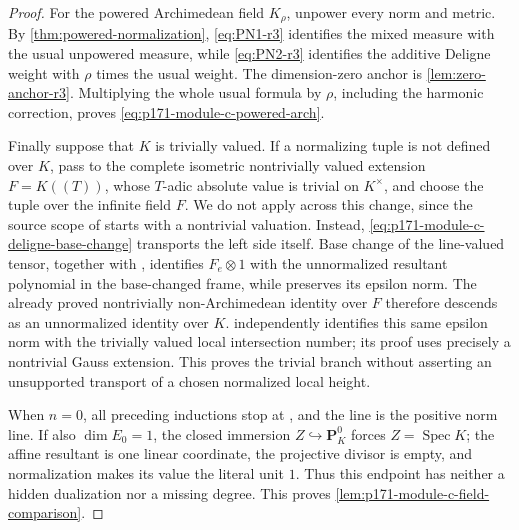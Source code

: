 \begin{proof}
For the powered Archimedean field \(K_\rho\), unpower every norm and metric.
By \cref{thm:powered-normalization}, \eqref{eq:PN1-r3} identifies the mixed
measure with the usual unpowered measure, while \eqref{eq:PN2-r3}
identifies the additive Deligne weight with \(\rho\) times the usual
weight.  The dimension-zero anchor is \cref{lem:zero-anchor-r3}.
Multiplying the whole usual formula by \(\rho\), including the harmonic
correction, proves \eqref{eq:p171-module-c-powered-arch}.

Finally suppose that \(K\) is trivially valued.  If a normalizing tuple is
not defined over \(K\), pass to the complete isometric nontrivially valued
extension \(F=K((T))\), whose \(T\)-adic absolute value is trivial on
\(K^\times\), and choose the tuple over the infinite field \(F\).  We do
not apply \cite[Proposition~3.8.9]{ChenMoriwaki21AdelicIntersection} across
this change, since the source scope of
\cite[Section~3.8]{ChenMoriwaki21AdelicIntersection} starts with a
nontrivial valuation.  Instead,
\eqref{eq:p171-module-c-deligne-base-change} transports the left side
itself.  Base change of the line-valued tensor, together with
\cite[Remark~1.6.8]{ChenMoriwaki21AdelicIntersection}, identifies
\(F_e\otimes 1\) with the unnormalized resultant polynomial in the
base-changed frame, while
\cite[Remark~3.8.3]{ChenMoriwaki21AdelicIntersection} preserves its epsilon
norm.  The already proved
nontrivially non-Archimedean identity over \(F\) therefore descends as an
unnormalized identity over \(K\).
\cite[Proposition~3.9.3, formula~(3.27)]{ChenMoriwaki21AdelicIntersection}
independently identifies this same epsilon norm with the trivially valued
local intersection number; its proof uses precisely a nontrivial Gauss
extension.  This proves the trivial branch without asserting an unsupported
transport of a chosen normalized local height.

When \(n=0\), all preceding inductions stop at
\cite[Theorem~8.16, formula~(8.11)]{BE21}, and the
line is the positive norm line.  If also \(\dim E_0=1\), the closed
immersion \(Z\hookrightarrow\mathbf P^0_K\) forces
\(Z=\operatorname{Spec}K\); the affine resultant is one linear coordinate,
the projective divisor is empty, and normalization makes its value the
literal unit \(1\).  Thus this endpoint has neither a hidden dualization
nor a missing degree.  This proves
\cref{lem:p171-module-c-field-comparison}.
\end{proof}

